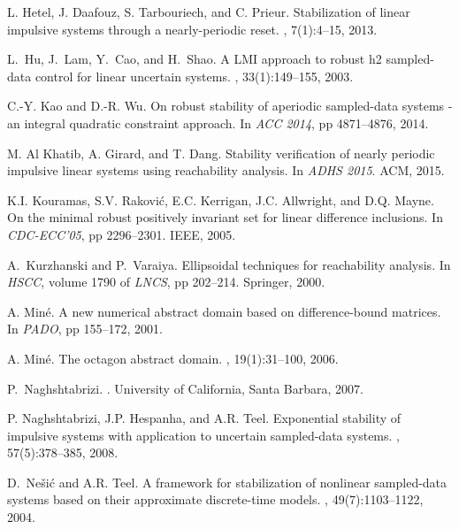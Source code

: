 \begin{thebibliography}{10}
L. Hetel, J. Daafouz, S. Tarbouriech, and C. Prieur.
\newblock Stabilization of linear impulsive systems through a nearly-periodic
  reset.
, 7(1):4--15, 2013.

L.~Hu, J.~Lam, Y.~Cao, and H.~Shao.
\newblock A  {LMI} approach to robust h2 sampled- data control for linear
  uncertain systems.
, 33(1):149--155, 2003.

C.{-}Y. Kao and D.{-}R. Wu.
\newblock On robust stability of aperiodic sampled-data systems - an integral
  quadratic constraint approach.
\newblock In {\em ACC 2014}, pp 4871--4876, 2014.

M. Al Khatib, A. Girard, and T. Dang.
\newblock Stability verification of nearly periodic impulsive linear systems
  using reachability analysis.
\newblock In {\em ADHS 2015}. ACM, 2015.

K.I. Kouramas, S.V. Rakovi{\'c}, E.C. Kerrigan, J.C. Allwright, and D.Q. Mayne.
\newblock On the minimal robust positively invariant set for linear difference
  inclusions.
\newblock In {\em CDC-ECC'05}, pp 2296--2301. IEEE,
  2005.

A.~Kurzhanski and P.~Varaiya.
\newblock Ellipsoidal techniques for reachability analysis.
\newblock In {\em HSCC}, volume 1790 of {\em {LNCS}}, pp 202--214.
  {Springer}, 2000.

A. Min{\'e}.
\newblock A new numerical abstract domain based on difference-bound matrices.
\newblock In {\em PADO}, pp 155--172, 2001.

A. Min{\'e}.
\newblock The octagon abstract domain.
, 19(1):31--100, 2006.

P.~Naghshtabrizi.
.
\newblock University of California, Santa Barbara, 2007.

P. Naghshtabrizi, J.P. Hespanha, and A.R. Teel.
\newblock Exponential stability of impulsive systems with application to
  uncertain sampled-data systems.
, 57(5):378--385, 2008.

D.~Ne{\v{s}}i{\'c} and A.R. Teel.
\newblock A framework for stabilization of nonlinear sampled-data systems based
  on their approximate discrete-time models.
, 49(7):1103--1122, 2004.


\end{thebibliography}
